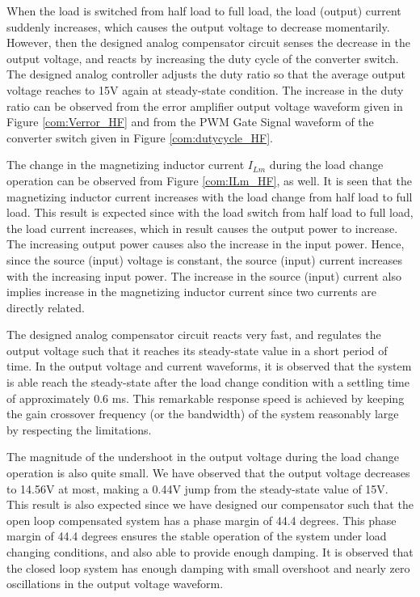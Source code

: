 When the load is switched from half load to full load, the load (output) current suddenly increases, which causes the output voltage to decrease momentarily. However, then the designed analog compensator circuit senses the decrease in the output voltage, and reacts by increasing the duty cycle of the converter switch. The designed analog controller adjusts the duty ratio so that the average output voltage reaches to 15V again at steady-state condition. The increase in the duty ratio can be observed from the error amplifier output voltage waveform given in Figure \ref{com:Verror_HF} and from the PWM Gate Signal waveform of the converter switch given in Figure \ref{com:dutycycle_HF}.

The change in the magnetizing inductor current $I_{Lm}$ during the load change operation can be observed from Figure \ref{com:ILm_HF}, as well. It is seen that the magnetizing inductor current increases with the load change from half load to full load. This result is expected since with the load switch from half load to full load, the load current increases, which in result causes the output power to increase. The increasing output power causes also the increase in the input power. Hence, since the source (input) voltage is constant, the source (input) current increases with the increasing input power. The increase in the source (input) current also implies increase in the magnetizing inductor current since two currents are directly related.

The designed analog compensator circuit reacts very fast, and regulates the output voltage such that it reaches its steady-state value in a short period of time. In the output voltage and current waveforms, it is observed that the system is able reach the steady-state after the load change condition with a settling time of approximately 0.6 ms. This remarkable response speed is achieved by keeping the gain crossover frequency (or the bandwidth) of the system reasonably large by respecting the limitations.

The magnitude of the undershoot in the output voltage during the load change operation is also quite small. We have observed that the output voltage decreases to 14.56V at most, making a 0.44V jump from the steady-state value of 15V. This result is also expected since we have designed our compensator such that the open loop compensated system has a phase margin of 44.4 degrees. This phase margin of 44.4 degrees ensures the stable operation of the system under load changing conditions, and also able to provide enough damping. It is observed that the closed loop system has enough damping with small overshoot and nearly zero oscillations in the output voltage waveform.

